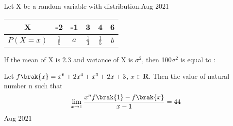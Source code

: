 \iffalse
  \title{Assignment}
  \author{EE24BTECH11038}
  \section{integer}
\fi  

\item Let X be a random variable with distribution.\hfill{Aug 2021}
\begin{table}[!ht]
\centering
\begin{tabular}{ |c|c|c|c|c|c| }
    \hline
    \textbf{X}  & \textbf{-2} & \textbf{-1} & \textbf{3} & \textbf{4} & \textbf{6} \\
    \hline
    $P\left(X=x\right)$ & $\frac{1}{5}$ & $a$ & $\frac{1}{3}$ & $\frac{1}{5}$ & $b$\\   
    \hline
\end{tabular}
\end{table}
If the mean of X is 2.3 and variance of X is $\sigma^2$, then 100$\sigma^2$ is equal to :
\bigskip
\item Let $f\brak{x}=x^6+2x^4+x^3+2x+3$, $x\in \mathbf{R}$. Then the value of natural number n such that  
\begin{align*}
    \lim_{x\to 1}\frac{x^nf\brak{1}-f\brak{x}}{x-1}=44
\end{align*} \hfill{Aug 2021}

